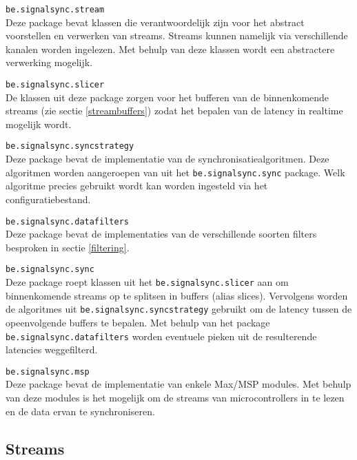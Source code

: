 \begin{description}	
	\item\texttt{be.signalsync.stream} \hfill \\
	Deze package bevat klassen die verantwoordelijk zijn voor het abstract voorstellen en verwerken van streams. Streams kunnen namelijk via verschillende kanalen worden ingelezen. Met behulp van deze klassen wordt een abstractere verwerking mogelijk.
	
	\item\texttt{be.signalsync.slicer} \hfill \\
	De klassen uit deze package zorgen voor het bufferen van de binnenkomende streams (zie sectie \ref{streambuffers}) zodat het bepalen van de latency in realtime mogelijk wordt. 

	\item\texttt{be.signalsync.syncstrategy} \hfill \\
	Deze package bevat de implementatie van de synchronisatiealgoritmen. Deze algoritmen worden aangeroepen van uit het \texttt{be.signalsync.sync} package. Welk algoritme precies gebruikt wordt kan worden ingesteld via het configuratiebestand.
	
	\item\texttt{be.signalsync.datafilters} \hfill \\
	Deze package bevat de implementaties van de verschillende soorten filters besproken in sectie \ref{filtering}.
	
	\item\texttt{be.signalsync.sync} \hfill \\
	Deze package roept klassen uit het \texttt{be.signalsync.slicer} aan om binnenkomende streams op te splitsen in buffers (alias slices). Vervolgens worden de algoritmes uit \texttt{be.signalsync.syncstrategy} gebruikt om de latency tussen de opeenvolgende buffers te bepalen. Met behulp van het package \texttt{be.signalsync.datafilters} worden eventuele pieken uit de resulterende latencies weggefilterd.

	\item\texttt{be.signalsync.msp} \hfill \\
	Deze package bevat de implementatie van enkele Max/MSP modules. Met behulp van deze modules is het mogelijk om de streams van microcontrollers in te lezen en de data ervan te synchroniseren.
	
\end{description}

\subsection{Streams}

